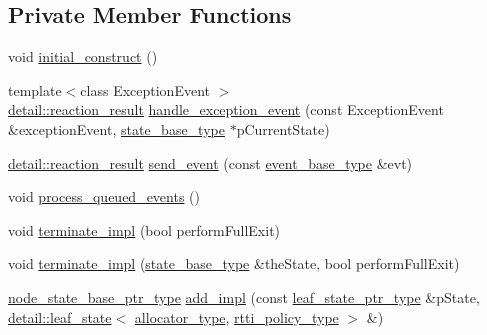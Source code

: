\subsection*{Private Member Functions}
\begin{DoxyCompactItemize}
\item 
void \mbox{\hyperlink{classboost_1_1statechart_1_1state__machine_a858feecd60fbbb1484cc8e01c1e1b5b0}{initial\+\_\+construct}} ()
\item 
{\footnotesize template$<$class Exception\+Event $>$ }\\\mbox{\hyperlink{namespaceboost_1_1statechart_1_1detail_ab091bbb4c29327fb46ee479ea1b7255b}{detail\+::reaction\+\_\+result}} \mbox{\hyperlink{classboost_1_1statechart_1_1state__machine_a870e55352a7a01e7224ae0f06f89b0e9}{handle\+\_\+exception\+\_\+event}} (const Exception\+Event \&exception\+Event, \mbox{\hyperlink{classboost_1_1statechart_1_1state__machine_a69cc258c29fcabec25c5dc8bedb7d530}{state\+\_\+base\+\_\+type}} $\ast$p\+Current\+State)
\item 
\mbox{\hyperlink{namespaceboost_1_1statechart_1_1detail_ab091bbb4c29327fb46ee479ea1b7255b}{detail\+::reaction\+\_\+result}} \mbox{\hyperlink{classboost_1_1statechart_1_1state__machine_ae429789fa4f90eecdce95f56fd72f985}{send\+\_\+event}} (const \mbox{\hyperlink{classboost_1_1statechart_1_1state__machine_adb0e98d6d780a0977209fa7389b20bcd}{event\+\_\+base\+\_\+type}} \&evt)
\item 
void \mbox{\hyperlink{classboost_1_1statechart_1_1state__machine_af158f951f31691cdec6c00b48612124c}{process\+\_\+queued\+\_\+events}} ()
\item 
void \mbox{\hyperlink{classboost_1_1statechart_1_1state__machine_a74a1650e45e284366802f9709b15cf31}{terminate\+\_\+impl}} (bool perform\+Full\+Exit)
\item 
void \mbox{\hyperlink{classboost_1_1statechart_1_1state__machine_a847e2c019fcd29ed9be547a81090c6a5}{terminate\+\_\+impl}} (\mbox{\hyperlink{classboost_1_1statechart_1_1state__machine_a69cc258c29fcabec25c5dc8bedb7d530}{state\+\_\+base\+\_\+type}} \&the\+State, bool perform\+Full\+Exit)
\item 
\mbox{\hyperlink{classboost_1_1statechart_1_1state__machine_a5d90f1176309ec8307979aa79dd6f4a3}{node\+\_\+state\+\_\+base\+\_\+ptr\+\_\+type}} \mbox{\hyperlink{classboost_1_1statechart_1_1state__machine_a1e24717585bec9141b46d1807c40f517}{add\+\_\+impl}} (const \mbox{\hyperlink{classboost_1_1statechart_1_1state__machine_a70f60d22dbc67497b1388e72e2bf6824}{leaf\+\_\+state\+\_\+ptr\+\_\+type}} \&p\+State, \mbox{\hyperlink{classboost_1_1statechart_1_1detail_1_1leaf__state}{detail\+::leaf\+\_\+state}}$<$ \mbox{\hyperlink{classboost_1_1statechart_1_1state__machine_a7345d6567cd1a829234bbb7f6c0715da}{allocator\+\_\+type}}, \mbox{\hyperlink{classboost_1_1statechart_1_1state__machine_af2a620c579a5248103aee4d3ccb4d632}{rtti\+\_\+policy\+\_\+type}} $>$ \&)

\end{DoxyCompactItemize}

